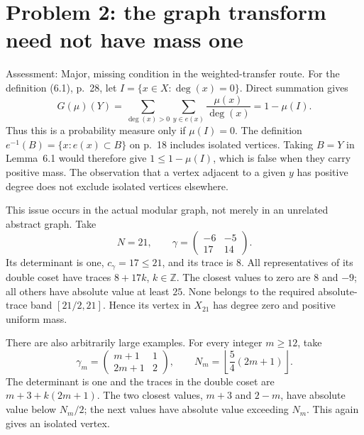 \documentclass[10pt]{article}
\begin{document}
\section*{Problem 2: the graph transform need not have mass one}
Assessment: Major, missing condition in the weighted-transfer route. For the definition (6.1), p. 28, let \(I=\{x\in X:\deg(x)=0\}\). Direct summation gives \[G(\mu)(Y)
 =\sum_{\deg(x)>0}\sum_{y\in e(x)}\frac{\mu(x)}{\deg(x)}
 =1-\mu(I).\] Thus this is a probability measure only if \(\mu(I)=0\). The definition \(e^{-1}(B)=\{x:e(x)\subset B\}\) on p. 18 includes isolated vertices. Taking \(B=Y\) in Lemma 6.1 would therefore give \(1\le 1-\mu(I)\), which is false when they carry positive mass. The observation that a vertex adjacent to a given \(y\) has positive degree does not exclude isolated vertices elsewhere.\par
This issue occurs in the actual modular graph, not merely in an unrelated abstract graph. Take \[N=21,\qquad
 \gamma=\begin{pmatrix}-6&-5\\17&14\end{pmatrix}.\] Its determinant is one, \(c_\gamma=17\le21\), and its trace is \(8\). All representatives of its double coset have traces \(8+17k\), \(k\in\mathbb Z\). The closest values to zero are \(8\) and \(-9\); all others have absolute value at least \(25\). None belongs to the required absolute-trace band \([21/2,21]\). Hence its vertex in \(X_{21}\) has degree zero and positive uniform mass.\par
There are also arbitrarily large examples. For every integer \(m\ge12\), take \[\gamma_m=\begin{pmatrix}m+1&1\\2m+1&2\end{pmatrix},
 \qquad N_m=\left\lfloor\frac54(2m+1)\right\rfloor .\] The determinant is one and the traces in the double coset are \(m+3+k(2m+1)\). The two closest values, \(m+3\) and \(2-m\), have absolute value below \(N_m/2\); the next values have absolute value exceeding \(N_m\). This again gives an isolated vertex.\par
\end{document}
